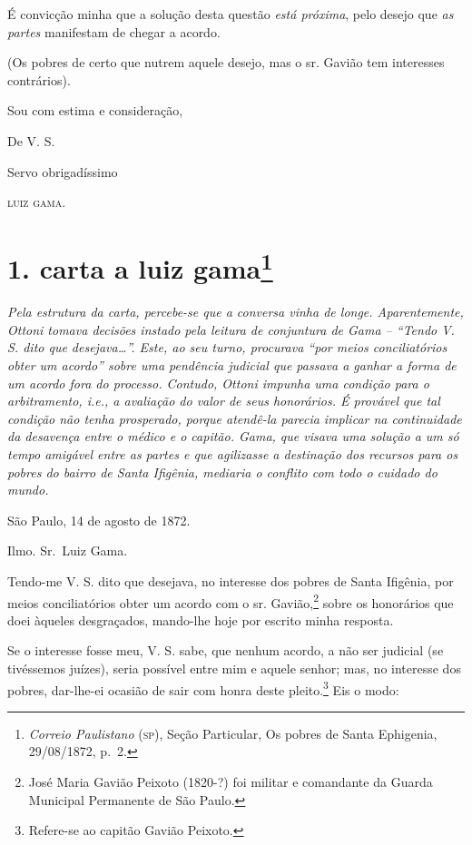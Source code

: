 É convicção minha que a solução desta questão \emph{está próxima}, pelo
desejo que \emph{as partes} manifestam de chegar a acordo.

(Os pobres de certo que nutrem aquele desejo, mas o sr. Gavião tem
interesses contrários).

Sou com estima e consideração,

De V. S.

Servo obrigadíssimo

\textsc{luiz gama}.

\chapter{1. carta a luiz gama\footnote{\emph{Correio Paulistano} (\textsc{sp}), Seção Particular, Os
  pobres de Santa Ephigenia, 29/08/1872, p.~2.}} %

\begin{didascalia}
\emph{Pela estrutura da carta, percebe-se que a conversa vinha de longe.
Aparentemente, Ottoni tomava decisões instado pela leitura de conjuntura
de Gama -- ``Tendo V. S. dito que desejava\ldots{}''. Este, ao seu turno,
procurava ``por meios conciliatórios obter um acordo'' sobre uma pendência
judicial que passava a ganhar a forma de um acordo fora do processo.
Contudo, Ottoni impunha uma condição para o arbitramento, i.e., a
avaliação do valor de seus honorários. É provável que tal condição não
tenha prosperado, porque atendê-la parecia implicar na continuidade da
desavença entre o médico e o capitão. Gama, que visava uma solução a um
só tempo amigável entre as partes e que agilizasse a destinação dos
recursos para os pobres do bairro de Santa Ifigênia, mediaria o conflito
com todo o cuidado do mundo.}
\end{didascalia}


São Paulo, 14 de agosto de 1872.

Ilmo. Sr.~Luiz Gama.

Tendo-me V. S. dito que desejava, no interesse dos pobres de Santa
Ifigênia, por meios conciliatórios obter um acordo com o sr.
Gavião,\footnote{ José Maria Gavião Peixoto (1820-?) foi militar e
  comandante da Guarda Municipal Permanente de São Paulo.} sobre os
honorários que doei àqueles desgraçados, mando-lhe hoje por escrito
minha resposta.

Se o interesse fosse meu, V. S. sabe, que nenhum acordo, a não ser
judicial (se tivéssemos juízes), seria possível entre mim e aquele
senhor; mas, no interesse dos pobres, dar-lhe-ei ocasião de sair com
honra deste pleito.\footnote{ Refere-se ao capitão Gavião Peixoto.} Eis
o modo:

